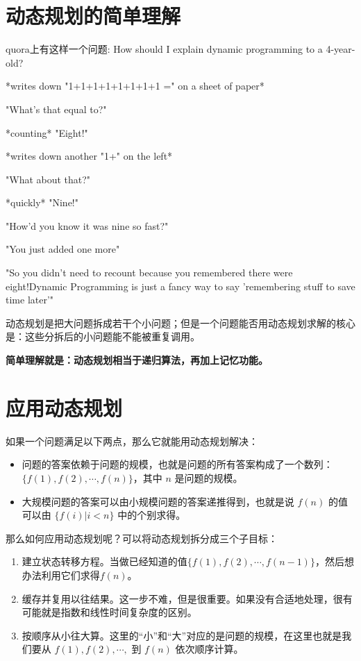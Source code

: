\documentclass[12pt]{article}
\begin{document}

\section{动态规划的简单理解 \cite{Simple_DynamicProgramming}}

quora上有这样一个问题: How should I explain dynamic programming to a 4-year-old?

*writes down "1+1+1+1+1+1+1+1 =" on a sheet of paper*

"What's that equal to?"

*counting* "Eight!"

*writes down another "1+" on the left*

"What about that?"

*quickly* "Nine!"

"How'd you know it was nine so fast?"

"You just added one more"

"So you didn't need to recount because you remembered there were eight!Dynamic Programming is just a fancy way to say 'remembering stuff to save time later'"

动态规划是把大问题拆成若干个小问题；但是一个问题能否用动态规划求解的核心是：这些分拆后的小问题能不能被重复调用。

\textbf{简单理解就是：动态规划相当于递归算法，再加上记忆功能。}

\section{应用动态规划\cite{Simple_DynamicProgramming-2}}
如果一个问题满足以下两点，那么它就能用动态规划解决：

\begin{itemize}[itemindent=2em]
    \item 问题的答案依赖于问题的规模，也就是问题的所有答案构成了一个数列：$\{f(1),f(2), \cdots, f(n)\}$，其中 $n$ 是问题的规模。
    
    \item 大规模问题的答案可以由小规模问题的答案递推得到，也就是说 $f(n)$ 的值可以由 $\{f(i)|i<n\}$ 中的个别求得。
\end{itemize}

那么如何应用动态规划呢？可以将动态规划拆分成三个子目标：

\begin{enumerate}[itemindent=2em]
    \item 建立状态转移方程。当做已经知道的值$\{f(1),f(2), \cdots, f(n-1)\}$，然后想办法利用它们求得$f(n)$。
    
    \item 缓存并复用以往结果。这一步不难，但是很重要。如果没有合适地处理，很有可能就是指数和线性时间复杂度的区别。

    \item 按顺序从小往大算。这里的“小”和“大”对应的是问题的规模，在这里也就是我们要从 $f(1), f(2), \cdots, $ 到 $f(n)$ 依次顺序计算。
\end{enumerate}



\end{document}
